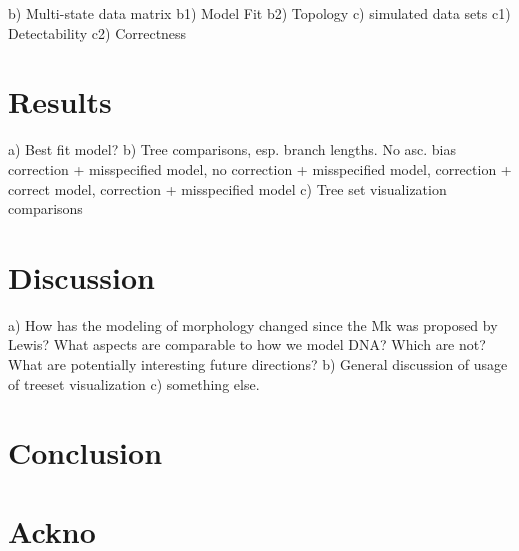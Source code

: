 \documentclass[]{article}
\begin{document}
	b) Multi-state data matrix
		b1) Model Fit
		b2) Topology
	c) simulated data sets
		c1) Detectability
		c2) Correctness
	
\section{Results}

	a) Best fit model?
	b) Tree comparisons, esp. branch lengths. No asc. bias correction + misspecified model, no correction + misspecified model, correction + correct model, correction + misspecified model 
	c) Tree set visualization comparisons
	
\section{Discussion}	

	a) How has the modeling of morphology changed since the Mk was proposed by Lewis? What aspects are comparable to how we model DNA? Which are not? What are potentially interesting future directions? 
	b) General discussion of usage of treeset visualization
	c) something else.

\section{Conclusion}	


\section{Ackno}	
\end{document}
